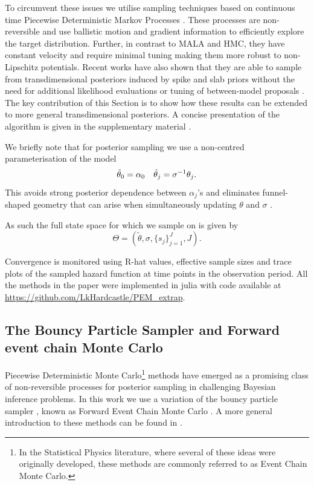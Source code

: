 \documentclass[ba,preprint]{imsart}
\theoremstyle{plain}
\theoremstyle{definition}
\theoremstyle{remark}
\begin{document}
To circumvent these issues we utilise sampling techniques based on continuous time Piecewise Deterministic Markov Processes \citep[PDMPs;][]{Fearnhead2024b}. These processes are non-reversible \citep{Andrieu2021} and use ballistic motion and gradient information to efficiently explore the target distribution. Further, in contrast to MALA and HMC, they have constant velocity and require minimal tuning making them more robust to non-Lipschitz potentials. Recent works have also shown that they are able to sample from transdimensional posteriors induced by spike and slab priors without the need for additional likelihood evaluations or tuning of between-model proposals \citep{Chevallier2023, Bierkens2023a}. The key contribution of this Section is to show how these results can be extended to more general transdimensional posteriors. A concise presentation of the algorithm is given in the supplementary material \citep[{\color{red}Section 2.1}]{Hardcastle2024supp}.

We briefly note that for posterior sampling we use a non-centred parameterisation of the model \citep{Betancourt2015}
\begin{equation*}
    \Tilde{\theta}_0 = \alpha_0 \quad \Tilde{\theta}_j = \sigma^{-1}\theta_j.
\end{equation*}
This avoids strong posterior dependence between $\alpha_j$'s and eliminates funnel-shaped geometry that can arise when simultaneously updating $\theta$ and $\sigma$ \citep[e.g.][]{Betancourt2015}. {\color{red}As such the full state space for which we sample on is given by
\begin{equation*}
    \Theta = (\tilde{\theta},\sigma, \{s_j\}_{j=1}^J,J).
\end{equation*}

Convergence is monitored using R-hat values, effective sample sizes and trace plots of the sampled hazard function at time points in the observation period. All the methods in the paper were implemented in julia with code available at \url{https://github.com/LkHardcastle/PEM_extrap}.}

\subsection{The Bouncy Particle Sampler and Forward event chain Monte Carlo}
\label{sec;BPS}

Piecewise Deterministic Monte Carlo\footnote{In the Statistical Physics literature, where several of these ideas were originally developed, these methods are commonly referred to as Event Chain Monte Carlo.} methods have emerged as a promising class of non-reversible processes for posterior sampling in challenging Bayesian inference problems. In this work we use a variation of the bouncy particle sampler \citep{Bouchard2018}, known as Forward Event Chain Monte Carlo \citep{Michel2020}. A more general introduction to these methods can be found in \cite{Fearnhead2024b}. 
\end{document}
